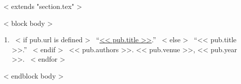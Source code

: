 ~< extends "section.tex" >~

~< block body >~
  \begin{enumerate}
    ~< for pub in items >~
      \item{
        ~< if pub.url is defined >~
          ``\href{<< pub.url >>}{<< pub.title >>}.''
        ~< else >~
          ``<< pub.title >>.''
        ~< endif >~
        << pub.authors >>.
        << pub.venue >>,
        << pub.year >>.
      }
    ~< endfor >~
  \end{enumerate}
~< endblock body >~
